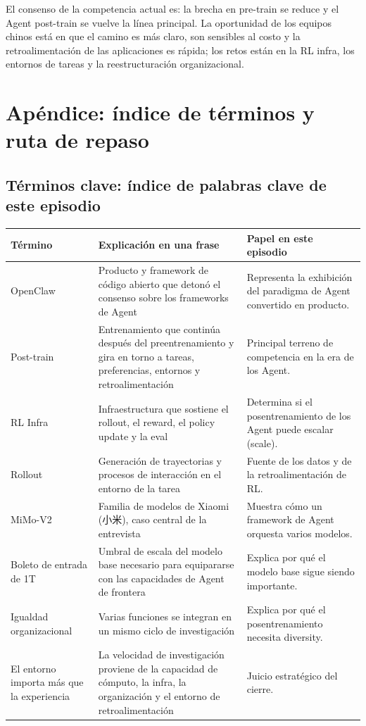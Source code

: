\documentclass[a4paper]{article}
\begin{document}
El consenso de la competencia actual es: la brecha en pre-train se reduce y el Agent post-train se vuelve la línea principal. La oportunidad de los equipos chinos está en que el camino es más claro, son sensibles al costo y la retroalimentación de las aplicaciones es rápida; los retos están en la RL infra, los entornos de tareas y la reestructuración organizacional.
\section{Apéndice: índice de términos y ruta de repaso}

\subsection{Términos clave: índice de palabras clave de este episodio}

\noindent\begin{longtable}{p{}p{}p{}}
\toprule
Término & Explicación en una frase & Papel en este episodio \\
\midrule
OpenClaw & Producto y framework de código abierto que detonó el consenso sobre los frameworks de Agent & Representa la exhibición del paradigma de Agent convertido en producto. \\
Post-train & Entrenamiento que continúa después del preentrenamiento y gira en torno a tareas, preferencias, entornos y retroalimentación & Principal terreno de competencia en la era de los Agent. \\
RL Infra & Infraestructura que sostiene el rollout, el reward, el policy update y la eval & Determina si el posentrenamiento de los Agent puede escalar (scale). \\
Rollout & Generación de trayectorias y procesos de interacción en el entorno de la tarea & Fuente de los datos y de la retroalimentación de RL. \\
MiMo-V2 & Familia de modelos de Xiaomi (小米), caso central de la entrevista & Muestra cómo un framework de Agent orquesta varios modelos. \\
Boleto de entrada de 1T & Umbral de escala del modelo base necesario para equipararse con las capacidades de Agent de frontera & Explica por qué el modelo base sigue siendo importante. \\
Igualdad organizacional & Varias funciones se integran en un mismo ciclo de investigación & Explica por qué el posentrenamiento necesita diversity. \\
El entorno importa más que la experiencia & La velocidad de investigación proviene de la capacidad de cómputo, la infra, la organización y el entorno de retroalimentación & Juicio estratégico del cierre. \\
\bottomrule
\end{longtable}
\end{document}
